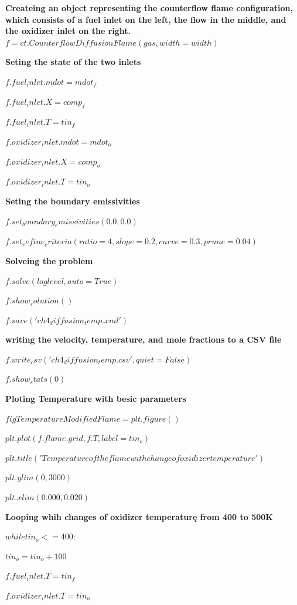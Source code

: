\documentclass[a4paper]{article}
\begin{document}
\textbf{Createing an object representing the counterflow flame configuration, which consists of a fuel inlet on the left, the flow in the middle, and the oxidizer inlet on the right.}
\hspace{5,35mm}$f = ct.CounterflowDiffusionFlame(gas, width=width)$

\textbf{Seting the state of the two inlets}

$f.fuel_inlet.mdot = mdot_f$

$f.fuel_inlet.X = comp_f$

$f.fuel_inlet.T = tin_f$

$f.oxidizer_inlet.mdot = mdot_o$

$f.oxidizer_inlet.X = comp_o$

$f.oxidizer_inlet.T = tin_o$

\textbf{Seting the boundary emissivities}

$f.set_boundary_emissivities(0.0, 0.0)$

$f.set_refine_criteria(ratio=4, slope=0.2, curve=0.3, prune=0.04)$

\textbf{Solveing the problem}

$f.solve(loglevel, auto=True)$

$f.show_solution()$

$f.save('ch4_diffusion_temp.xml')$

\textbf{writing the velocity, temperature, and mole fractions to a CSV file}

$f.write_csv('ch4_diffusion_temp.csv', quiet=False)$

$f.show_stats(0)$

\textbf{Ploting Temperature with besic parameters}

$figTemperatureModifiedFlame = plt.figure()$

$plt.plot(f.flame.grid, f.T, label=tin_o )$

$plt.title('Temperature of the flame with change of oxidizer temperature')$

$plt.ylim(0,3000)$

$plt.xlim(0.000, 0.020)$

\textbf{Looping whih changes of oxidizer temperaturę from 400 to 500K}

$while tin_o <= 400:$

\hspace{5,35mm}$    tin_o=tin_o+100$

\hspace{5,35mm}$    f.fuel_inlet.T = tin_f$

\hspace{5,35mm}$    f.oxidizer_inlet.T = tin_o$
\end{document}
